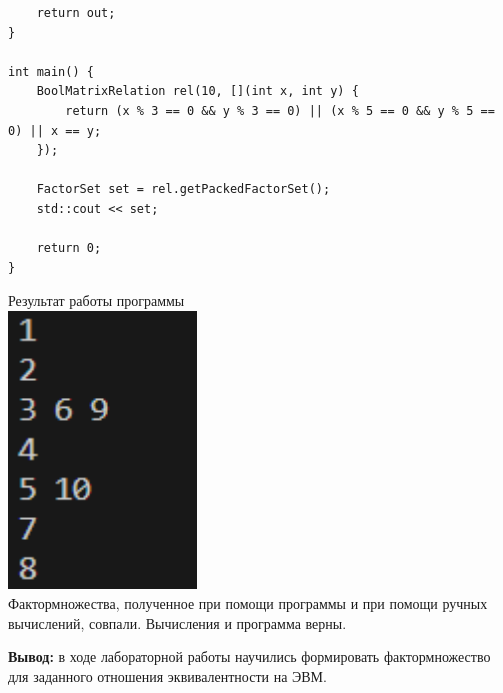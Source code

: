 \documentclass[a4paper,14pt]{extarticle}
\begin{document}
\begin{enumerate}[1.]
\begin{verbatim}
    return out;
}

int main() {
    BoolMatrixRelation rel(10, [](int x, int y) {
        return (x % 3 == 0 && y % 3 == 0) || (x % 5 == 0 && y % 5 == 0) || x == y;
    });

    FactorSet set = rel.getPackedFactorSet();
    std::cout << set;
    
    return 0;
}
			\end{verbatim}
	      Результат работы программы\\
	      \includegraphics[width=50mm]{task2}\\
	      Фактормножества, полученное при помощи программы и при помощи ручных вычислений, совпали. Вычисления и программа верны.
\end{enumerate}

\textbf{Вывод: } в ходе лабораторной работы научились формировать фактормножество для заданного
отношения эквивалентности на ЭВМ.
\end{document}
